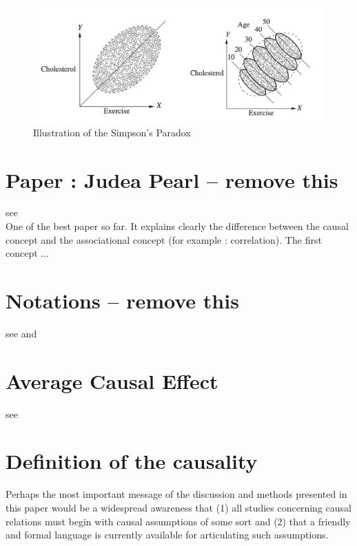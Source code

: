\documentclass{article}
\begin{document}
\begin{figure}[h]
\centering
\includegraphics[width=0.8 \textwidth]{figures/simpson.png}
\caption{Illustration of the Simpson’s Paradox\cite{pearl2016causal}}
\end{figure}


\section{Paper : Judea Pearl -- remove this}

see \cite{pearl2010mathematics} \\
One of the best paper so far. It explains clearly the difference between the causal concept and the associational concept (for example : correlation). The first concept ...




\section{Notations -- remove this}
see \cite{yao2020survey} and \cite{hernan2020causal}


\section{Average Causal Effect}

see \cite{hernan2020causal}


\section{Definition of the causality}

Perhaps the most important message of the discussion and methods presented in this paper would be a widespread awareness that (1) all studies concerning causal relations must begin with causal assumptions of some sort and (2) that a friendly and formal language is currently available for articulating such assumptions.\cite{pearl2010mathematics}
\end{document}
